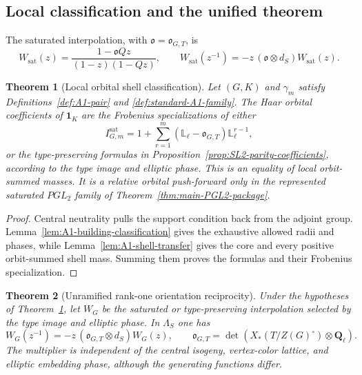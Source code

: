 \documentclass[11pt]{article}
\newtheorem{theorem}{Theorem}[section]
\theoremstyle{definition}
\theoremstyle{remark}
\newcommand{\Qell}{\mathbf Q_\ell}
\newcommand{\Lell}{\mathbb L_{\ell}}
\newcommand{\one}{\mathbf 1}
\begin{document}
\subsection{Local classification and the unified theorem}

The saturated interpolation, with $\mathfrak o=\mathfrak o_{G,T}$, is
\begin{equation}
 W_{\mathrm{sat}}(z)
 =\frac{1-\mathfrak o Qz}{(1-z)(1-Qz)},
 \qquad
 W_{\mathrm{sat}}(z^{-1})
 =-z\,(\mathfrak o\otimes d_S)W_{\mathrm{sat}}(z).
 \label{eq:A1-saturated-reciprocity}
\end{equation}

\begin{theorem}[Local orbital shell classification]
\label{thm:A1-local-shell-classification}
Let $(G,K)$ and $\gamma_m$ satisfy Definitions~\ref{def:A1-pair} and
\ref{def:standard-A1-family}.  The Haar orbital coefficients of $\one_K$ are
the Frobenius specializations of either
\begin{equation}
 I_{G,m}^{\mathrm{sat}}
 =1+\sum_{r=1}^m(\Lell-\mathfrak o_{G,T})\Lell^{r-1},
 \label{eq:A1-saturated-shell-class}
\end{equation}
or the type-preserving formulas in
Proposition~\ref{prop:SL2-parity-coefficients}, according to the type image
and elliptic phase.  This is an equality of local orbit-summed masses.  It is
a relative orbital push-forward only in the represented saturated $PGL_2$
family of Theorem~\ref{thm:main-PGL2-package}.
\end{theorem}

\begin{proof}
Central neutrality pulls the support condition back from the adjoint group.
Lemma~\ref{lem:A1-building-classification} gives the exhaustive allowed
radii and phases, while Lemma~\ref{lem:A1-shell-transfer} gives the core and
every positive orbit-summed shell mass.  Summing them proves the formulas and
their Frobenius specialization.
\end{proof}

\begin{theorem}[Unramified rank-one orientation reciprocity]
\label{thm:A1-orientation-reciprocity}
Under the hypotheses of Theorem~\ref{thm:A1-local-shell-classification}, let
$W_G$ be the saturated or type-preserving interpolation selected by the type
image and elliptic phase.  In $\Lambda_S$ one has
\begin{equation}
 \boxed{
 W_G(z^{-1})
 =-z\,(\mathfrak o_{G,T}\otimes d_S)W_G(z),
 \qquad
 \mathfrak o_{G,T}
 =\det\!\left(X_*(T/Z(G)^\circ)\otimes\Qell\right).}
 \label{eq:A1-orientation-reciprocity}
\end{equation}
The multiplier is independent of the central isogeny, vertex-color lattice,
and elliptic embedding phase, although the generating functions differ.
\end{theorem}
\end{document}
